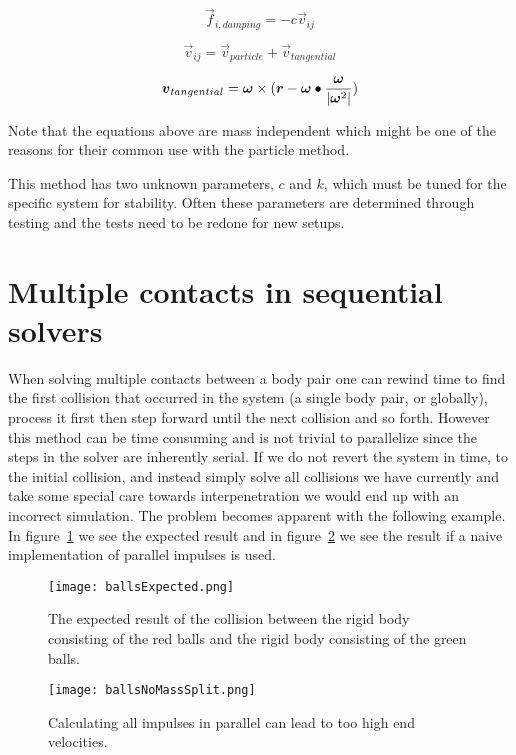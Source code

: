 \begin{equation}
  \vec{f}_{i,damping} = -c\vec{v}_{ij}
\end{equation}

\begin{equation}
  \vec{v}_{ij} = \vec{v}_{particle} + \vec{v}_{tangential}
\end{equation}

\begin{equation}\label{eq:tangent}
  \boldsymbol{v}_{tangential} = \boldsymbol{\omega} \times ( \boldsymbol{r}- \boldsymbol{\omega}\bullet\frac{\boldsymbol{\omega}}{|\boldsymbol{\omega}^2|})
\end{equation}

Note that the equations above are mass independent which might be one of the
reasons for their common use with the particle method.

This method has two unknown parameters, $c$ and $k$, which must be tuned for the
specific system for stability. Often these parameters are determined through testing
and the tests need to be redone for new setups.

\section{Multiple contacts in sequential solvers}
When solving multiple contacts between a body pair one can rewind time to
find the first collision
that occurred in the system (a single body pair, or globally), process it first
then step forward until the next collision and so forth. However this method can
be time consuming and is not trivial to parallelize since the steps in the solver are inherently serial.
If we do not revert the system in time, to the initial collision, and
instead simply solve all collisions we have currently and take some special care
towards interpenetration we would end up with an incorrect simulation. The problem
becomes apparent with the following example.
In figure~\ref{fig:ballsExpected} we see the expected result and in
figure~\ref{fig:noSplit} we see the result if a naive implementation of
parallel impulses is used.

\begin{figure}[H]
  \centering
  \texttt{[image: ballsExpected.png]}
  \caption{The expected result of the collision between the rigid body consisting
  of the red balls and the rigid body consisting of the green balls.}
  \label{fig:ballsExpected}
\end{figure}

\begin{figure}[H]
  \centering
  \texttt{[image: ballsNoMassSplit.png]}
  \caption{Calculating all impulses in parallel can lead to too high end velocities.}
  \label{fig:noSplit}
\end{figure}

